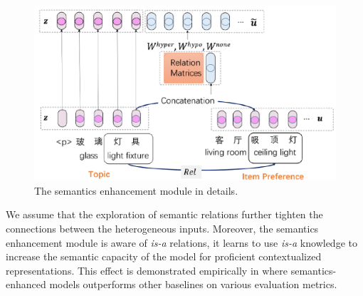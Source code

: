 \begin{figure}[th!]
	\centering
	\includegraphics[width=1\columnwidth]{figures/enhancement}
	\caption{The semantics enhancement module in details.}
	\label{fig:enhancement}
\end{figure}


%


We assume that the exploration of semantic relations further tighten the connections between 
the heterogeneous inputs.
Moreover, the semantics enhancement module is aware of \emph{is-a} relations,
it learns to use \emph{is-a} knowledge to increase the semantic capacity of the model 
for proficient contextualized representations.
This effect is demonstrated empirically in  where
semantics-enhanced models outperforms other baselines on various evaluation metrics.


